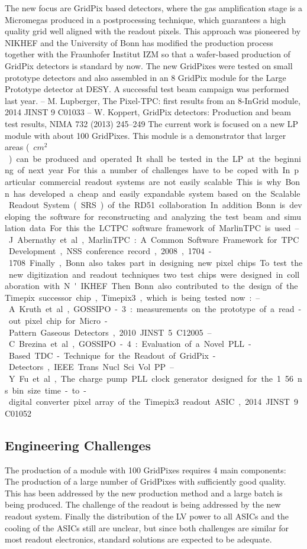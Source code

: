 The new focus are GridPix based detectors, where the gas amplification stage is a Micromegas produced in a postprocessing technique, which guarantees a high quality grid well aligned with the readout pixels. This approach was pioneered by NIKHEF and the University of Bonn has modified the production process together with the Fraunhofer Institut IZM so that a wafer-based production of GridPix detectors is standard by now. The new GridPixes were tested on small prototype detectors and also assembled in an 8 GridPix module for the Large Prototype detector at DESY. A successful test beam campaign was performed last year.
– M. Lupberger, The Pixel-TPC: first results from an 8-InGrid module, 2014 JINST 9 C01033
– W. Koppert, GridPix detectors: Production and beam test results, NIMA 732 (2013) 245–249 The current work is focused on a new LP module with about 100 GridPixes. This module is a demonstrator that larger areas (~\unit[400]{$cm^2$}) can be produced and operated. It shall be tested in the LP at the beginning of next year. For this a number of challenges have to be coped with. In particular commercial readout systems are not easily scalable. This is why Bonn has developed a cheap and easily expandable system based on the Scalable Readout System (SRS) of the RD51 collaboration.
In addition Bonn is developing the software for reconstructing and analyzing the test beam and simulation data. For this the LCTPC software framework of MarlinTPC is used.
– J. Abernathy et al., MarlinTPC: A Common Software Framework for TPC Development, NSS conference record, 2008, 1704-1708
Finally, Bonn also takes part in designing new pixel chips. To test the new digitization and readout techniques two test chips were designed in collaboration with N'IKHEF. Then Bonn also contributed to the design of the Timepix successor chip, Timepix3, which is being tested now:
– A. Kruth et al., GOSSIPO-3: measurements on the prototype of a read-out pixel chip for Micro- Pattern Gaseous Detectors, 2010 JINST 5 C12005
– C. Brezina et al., GOSSIPO-4: Evaluation of a Novel PLL-Based TDC-Technique for the Readout of GridPix-Detectors, IEEE Trans. Nucl. Sci. Vol. PP
– Y. Fu et al., The charge pump PLL clock generator designed for the 1.56 ns bin size time-to-digital converter pixel array of the Timepix3 readout ASIC, 2014 JINST 9 C01052
\subsection{Engineering Challenges}
The production of a module with 100 GridPixes requires 4 main components: The production of a
large number of GridPixes with sufficiently good quality. This has been addressed by the new production method and a large batch is being produced. The challenge of the readout is being addressed by the new readout system. Finally the distribution of the LV power to all ASICs and the cooling of the ASICs still are unclear, but since both challenges are similar for most readout electronics, standard solutions are expected to be adequate.

